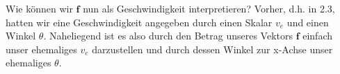\documentclass[a4paper,12pt,ngerman]{scrartcl}
\theoremstyle{plain}
\theoremstyle{plain}
\theoremstyle{plain}
\theoremstyle{plain}
\begin{document}
Wie können wir $\pmb{f}$ nun als Geschwindigkeit interpretieren? Vorher, d.h. in 2.3, hatten wir eine Geschwindigkeit angegeben durch einen Skalar $v_e$ und einen Winkel $\theta$. Naheliegend ist es also durch den Betrag unseres Vektors $\pmb{f}$ einfach unser ehemaliges $v_e$ darzustellen und durch dessen Winkel zur x-Achse unser ehemaliges $\theta$.\pagebreak

%
%
%
\end{document}
